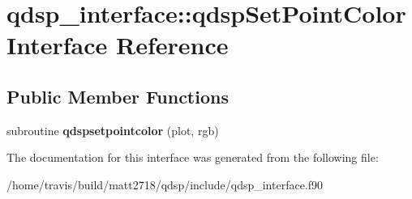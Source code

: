 \hypertarget{interfaceqdsp__interface_1_1qdspSetPointColor}{\section{qdsp\-\_\-interface\-:\-:qdsp\-Set\-Point\-Color Interface Reference}
\label{interfaceqdsp__interface_1_1qdspSetPointColor}
}
\subsection*{Public Member Functions}
\begin{DoxyCompactItemize}
\item 
\hypertarget{interfaceqdsp__interface_1_1qdspSetPointColor_a05b0f19beeb084d38d64f855286a0b1b}{subroutine {\bfseries qdspsetpointcolor} (plot, rgb)}\label{interfaceqdsp__interface_1_1qdspSetPointColor_a05b0f19beeb084d38d64f855286a0b1b}

\end{DoxyCompactItemize}


The documentation for this interface was generated from the following file\-:\begin{DoxyCompactItemize}
\item 
/home/travis/build/matt2718/qdsp/include/qdsp\-\_\-interface.\-f90\end{DoxyCompactItemize}
